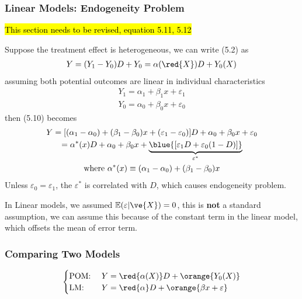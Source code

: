 \documentclass[11pt]{article}
\begin{document}
				\subsubsection{Linear Models: Endogeneity Problem}
				\begin{remark}
					\hl{This section needs to be revised, equation 5.11, 5.12}
				\end{remark}
					\par Suppose the treatment effect is heterogeneous, we can write (5.2) as 
					\begin{gather}
						Y = (Y_1 - Y_0) D + Y_0 = \alpha(\red{X}) D + Y_0(X)
					\end{gather}
					assuming both potential outcomes are linear in individual characteristics 
					\begin{gather}
						Y_1 = \alpha_1 + \beta_1 x + \varepsilon_1 \\
						Y_0 = \alpha_0 + \beta_0 x + \varepsilon_0
					\end{gather}
					then (5.10) becomes 
					\begin{gather}
						Y = [(\alpha_1 - \alpha_0) + (\beta_1 - \beta_0)x + (\varepsilon_1 - \varepsilon_0)]D + \alpha_0 + \beta_0 x + \varepsilon_0 \\
						= \alpha^*(x) D  + \alpha_0 + \beta_0 x + \underbrace{\blue{[\varepsilon_1 D + \varepsilon_0(1 - D)]}}_{\varepsilon^*} \\
						\tx{where } \alpha^*(x) \equiv (\alpha_1 - \alpha_0) + (\beta_1 - \beta_0)x
					\end{gather}
					Unless $\varepsilon_0 = \varepsilon_1$, the $\varepsilon^*$ is correlated with $D$, which causes endogeneity problem.
					\begin{remark}
						In Linear models, we assumed $\expect{\varepsilon|\ve{X}} = 0$, this is \textbf{not} a standard assumption, we can assume this because of the constant term in the linear model, which offsets the mean of error term.
					\end{remark}
				\subsubsection{Comparing Two Models}
					\begin{gather}
						\begin{cases}
							\tx{POM: } &Y = \red{\alpha(X)} D + \orange{Y_0(X)} \\
							\tx{LM: } &Y = \red{\alpha} D + \orange{\beta x + \varepsilon}
						\end{cases}
					\end{gather}
					
\end{document}
